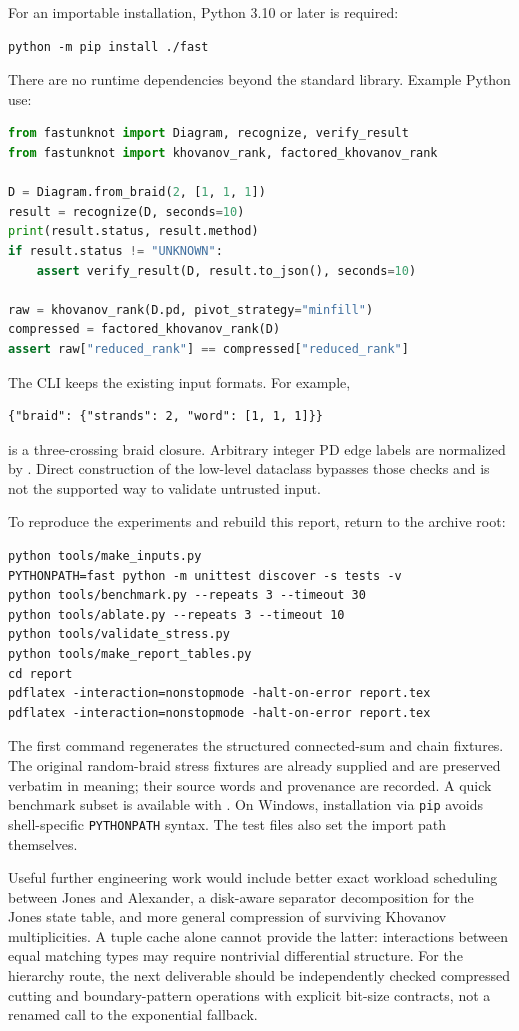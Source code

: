 \documentclass[11pt,a4paper]{article}
\theoremstyle{definition}\newtheorem{remark}[theorem]{Remark}
\begin{document}
For an importable installation, Python 3.10 or later is required:
\begin{lstlisting}
python -m pip install ./fast
\end{lstlisting}
There are no runtime dependencies beyond the standard library. Example Python use:
\begin{lstlisting}[language=Python]
from fastunknot import Diagram, recognize, verify_result
from fastunknot import khovanov_rank, factored_khovanov_rank

D = Diagram.from_braid(2, [1, 1, 1])
result = recognize(D, seconds=10)
print(result.status, result.method)
if result.status != "UNKNOWN":
    assert verify_result(D, result.to_json(), seconds=10)

raw = khovanov_rank(D.pd, pivot_strategy="minfill")
compressed = factored_khovanov_rank(D)
assert raw["reduced_rank"] == compressed["reduced_rank"]
\end{lstlisting}

The CLI keeps the existing input formats. For example,
\begin{lstlisting}
{"braid": {"strands": 2, "word": [1, 1, 1]}}
\end{lstlisting}
is a three-crossing braid closure. Arbitrary integer PD edge labels are
normalized by . Direct construction of the low-level
 dataclass bypasses those checks and is not the supported way to
validate untrusted input.

To reproduce the experiments and rebuild this report, return to the archive root:
\begin{lstlisting}
python tools/make_inputs.py
PYTHONPATH=fast python -m unittest discover -s tests -v
python tools/benchmark.py --repeats 3 --timeout 30
python tools/ablate.py --repeats 3 --timeout 10
python tools/validate_stress.py
python tools/make_report_tables.py
cd report
pdflatex -interaction=nonstopmode -halt-on-error report.tex
pdflatex -interaction=nonstopmode -halt-on-error report.tex
\end{lstlisting}
The first command regenerates the structured connected-sum and chain fixtures.
The original random-braid stress fixtures are already supplied and are preserved
verbatim in meaning; their source words and provenance are recorded. A quick
benchmark subset is available with . On Windows, installation via
\texttt{pip} avoids shell-specific \texttt{PYTHONPATH} syntax. The test files
also set the import path themselves.

Useful further engineering work would include better exact workload scheduling
between Jones and Alexander, a disk-aware separator decomposition for the
Jones state table, and more general compression of surviving Khovanov
multiplicities. A tuple cache alone cannot provide the latter: interactions
between equal matching types may require nontrivial differential structure.
For the hierarchy route, the next deliverable should be independently checked
compressed cutting and boundary-pattern operations with explicit bit-size
contracts, not a renamed call to the exponential fallback.
\end{document}
